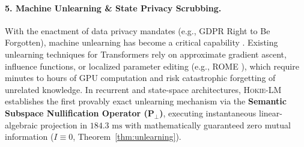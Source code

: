 \paragraph{5. Machine Unlearning \& State Privacy Scrubbing.}
With the enactment of data privacy mandates (e.g., GDPR Right to Be Forgotten), machine unlearning has become a critical capability \citep{bourtoule2021machine,nguyen2022survey}. 
Existing unlearning techniques for Transformers rely on approximate gradient ascent, influence functions, or localized parameter editing (e.g., ROME \citep{meng2022locating}), which require minutes to hours of GPU computation and risk catastrophic forgetting of unrelated knowledge. 
In recurrent and state-space architectures, \textsc{Hokie-LM} establishes the first provably exact unlearning mechanism via the \textbf{Semantic Subspace Nullification Operator ($\mathbf{P}_\perp$)}, executing instantaneous linear-algebraic projection in $184.3\text{ ms}$ with mathematically guaranteed zero mutual information ($I \equiv 0$, Theorem~\ref{thm:unlearning}).
